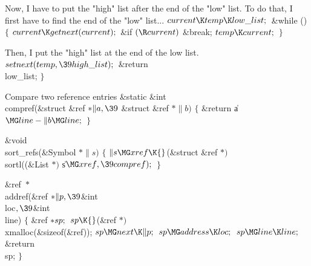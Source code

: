 Now, I have to put the "high" list after the end of the "low" list.
To do that, I first have to find the end of the "low" list...
\Y\B$\\{current}\K\\{temp}\K\\{low\_list};{}$\6
\&{while} ()\5
${}\{{}$\1\6
${}\\{current}\K\\{getnext}(\\{current});{}$\6
\&{if} ${}(\R\\{current}){}$\1\5
\&{break};\2\6
${}\\{temp}\K\\{current};{}$\6
\4${}\}{}$\2\par
\fi

Then, I put the "high" list at the end of the low list.
\Y\B$\\{setnext}(\\{temp},\39\\{high\_list});{}$\6
\&{return} \\{low\_list}; $\}{}$\par
\fi

Compare two reference entries
\Y\B\&{static} \&{int} \\{compref}(\&{struct} \&{ref} ${}{*}\|a,\39{}$%
\&{struct} \&{ref} ${}{*}\|b){}$\1\1\2\2\6
${}\{{}$\1\6
\&{return} \|a${}\MG\\{line}-\|b\MG\\{line};{}$\6
\4${}\}{}$\2\par
\fi

\Y\B\&{void} \\{sort\_refs}(\&{Symbol} ${}{*}\|s){}$\1\1\2\2\6
${}\{{}$\1\6
${}\|s\MG\\{xref}\K{}$(\&{struct} \&{ref} ${}{*}){}$ \\{sortl}((\&{List}
${}{*}){}$ \|s${}\MG\\{xref},\39\\{compref});{}$\6
\4${}\}{}$\2\par
\fi

\Y\B\&{ref} ${}{*}{}$\\{addref}(\&{ref} ${}{*}\|p,\39{}$\&{int} \\{loc}${},%
\39{}$\&{int} \\{line})\1\1\2\2\6
${}\{{}$\1\6
\&{ref} ${}{*}\\{sp};{}$\7
${}\\{sp}\K{}$(\&{ref} ${}{*}){}$ \\{xmalloc}(\&{sizeof}(\&{ref}));\6
${}\\{sp}\MG\\{next}\K\|p;{}$\6
${}\\{sp}\MG\\{address}\K\\{loc};{}$\6
${}\\{sp}\MG\\{line}\K\\{line};{}$\6
\&{return} \\{sp};\6
\4${}\}{}$\2\par
\fi


\inx
\fin
\con
